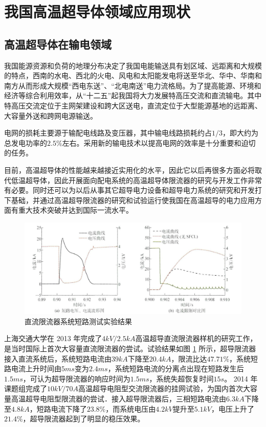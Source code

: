 \documentclass[UTF8, twocolumn]{ctexart}
\begin{document}
\section{我国高温超导体领域应用现状}

    \subsection{高温超导体在输电领域}

    我国能源资源和负荷的地理分布决定了我国电能输送具有划区域、远距离和大规模的特点，西南的水电、西北的火电、风电和太阳能发电将送至华北、华中、华南和南方从而形成大规模“西电东送”、“北电南送”电力流格局\cite{严陆光2014关于发展高温超导输电的建议}。为了提高能源、环境和经济等综合利用效率，从“十二五”起我国将大力发展特高压交流和直流输电。其中特高压交流定位于主网架建设和跨大区送电，直流定位于大型能源基地的远距离、大容量外送和跨网电源输送。

    电网的损耗主要源于输配电线路及变压器，其中输电线路损耗约占$1/3$，即大约为总发电功率的$2.5\%$左右。采用新的输电技术以提高电网的效率是十分重要和迫切的任务。

    目前，高温超导体的性能越来越接近实用化的水平，因此它以后再很多方面必将取代低温超导体，因此开展面向配电系统的高温超导体限流器的研究与开发工作非常有必要。同时还可以为以后从事其它超导电力设备和超导电力系统的研究和开发打下基础，并通过高温超导限流器的研究和试验运行使我国在高温超导的电力应用方面有重大技术突破并达到国际一流水平\cite{肖立业1999超导限流器}。

    \begin{figure}[hb]
        \centering
        \includegraphics[scale=1.2]{image/直流限流器系统短路测试实验结果.jpg}
        \caption{直流限流器系统短路测试实验结果}
        \label{fig:image5}
    \end{figure}

    上海交通大学在 2013 年完成了$4kV/2.5kA$高温超导直流限流器样机的研究工作，是当时国际上首次大容量直流限流器的尝试。试验结果如图 \ref{fig:image5} 所示，超导限流器接入直流系统后，系统短路电流由$39kA$下降至$20.4kA$，限流比达$47.71\%$，系统短路电流上升时间由$5ms$变为$2.4ms$，系统短路电流的分离点出现在短路发生后$1.5ms$，可认为超导限流器的响应时间为$1.5ms$，系统失超恢复时间$15s$。 2014 年课题组完成了$10kV/70A$高温超导电阻型交流限流器的挂网试验，为国内首次大容量高温超导电阻型限流器的尝试．接入超导限流器后，三相短路电流由$6.3kA$下降至$4.8kA$，短路电流下降了$23.8\%$，而系统电压由$4.2kV$提升至$5.1kV$，电压上升了$21.4\%$，超导限流器起到了明显的稳压效果\cite{金之俭2018二代高温超导材料的应用技术与发展综述}。
\end{document}
